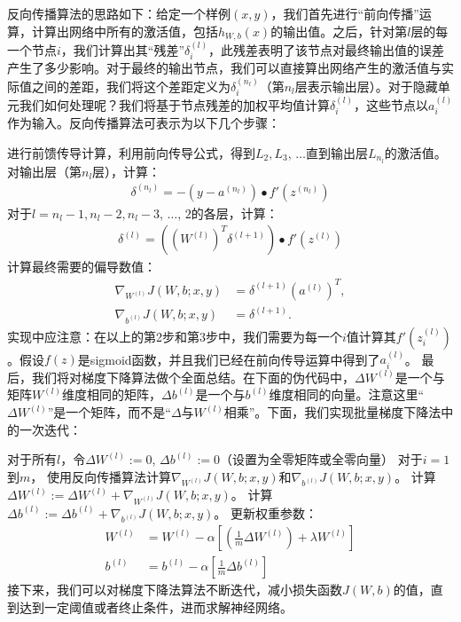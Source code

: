 反向传播算法的思路如下：给定一个样例$(x,y)$，我们首先进行“前向传播”运算，计算出网络中所有的激活值，包括$h_{W,b}(x)$的输出值。之后，针对第$l$层的每一个节点$i$，我们计算出其“残差”$\delta^{(l)}_i$，此残差表明了该节点对最终输出值的误差产生了多少影响。对于最终的输出节点，我们可以直接算出网络产生的激活值与实际值之间的差距，我们将这个差距定义为$\delta^{(n_l)}_i$（第$n_l$层表示输出层）。对于隐藏单元我们如何处理呢？我们将基于节点残差的加权平均值计算$\delta^{(l)}_i$，这些节点以$a^{(l)}_i$作为输入。反向传播算法可表示为以下几个步骤：\par
进行前馈传导计算，利用前向传导公式，得到$L_2, L_3$, $\ldots$直到输出层$L_{n_l}$的激活值。
对输出层（第$n_l$层），计算：
\begin{align}
	\delta^{(n_l)}
	= - (y - a^{(n_l)}) \bullet f'(z^{(n_l)})
\end{align}
对于$l = n_l-1, n_l-2, n_l-3$, $\ldots$, $2$的各层，计算：
\begin{align}
	\delta^{(l)} = \left((W^{(l)})^T \delta^{(l+1)}\right) \bullet f'(z^{(l)})
\end{align}
计算最终需要的偏导数值：
\begin{align}
	\nabla_{W^{(l)}} J(W,b;x,y) &= \delta^{(l+1)} (a^{(l)})^T, \\
	\nabla_{b^{(l)}} J(W,b;x,y) &= \delta^{(l+1)}.
\end{align}
实现中应注意：在以上的第2步和第3步中，我们需要为每一个$i$值计算其$f'(z^{(l)}_i)$。假设$f(z)$是sigmoid函数，并且我们已经在前向传导运算中得到了$a^{(l)}_i$。
最后，我们将对梯度下降算法做个全面总结。在下面的伪代码中，$\Delta W^{(l)}$是一个与矩阵$W^{(l)}$维度相同的矩阵，$\Delta b^{(l)}$是一个与$b^{(l)}$维度相同的向量。注意这里“$\Delta W^{(l)}$”是一个矩阵，而不是“$ \Delta$与$W^{(l)}$相乘”。下面，我们实现批量梯度下降法中的一次迭代：\par

对于所有$l$，令$\Delta W^{(l)} := 0$, $\Delta b^{(l)} := 0 $（设置为全零矩阵或全零向量）
对于$i = 1$到$m$，
使用反向传播算法计算$\nabla_{W^{(l)}} J(W,b;x,y)$和$\nabla_{b^{(l)}} J(W,b;x,y)$。
计算$\Delta W^{(l)} := \Delta W^{(l)} + \nabla_{W^{(l)}} J(W,b;x,y)$。
计算$\Delta b^{(l)} := \Delta b^{(l)} + \nabla_{b^{(l)}} J(W,b;x,y)$。
更新权重参数：
\begin{align}
	W^{(l)} &= W^{(l)} - \alpha \left[ \left(\frac{1}{m} \Delta W^{(l)} \right) + \lambda W^{(l)}\right] \\
	b^{(l)} &= b^{(l)} - \alpha \left[\frac{1}{m} \Delta b^{(l)}\right]
\end{align}
接下来，我们可以对梯度下降法算法不断迭代，减小损失函数$J(W,b)$的值，直到达到一定阈值或者终止条件，进而求解神经网络。

